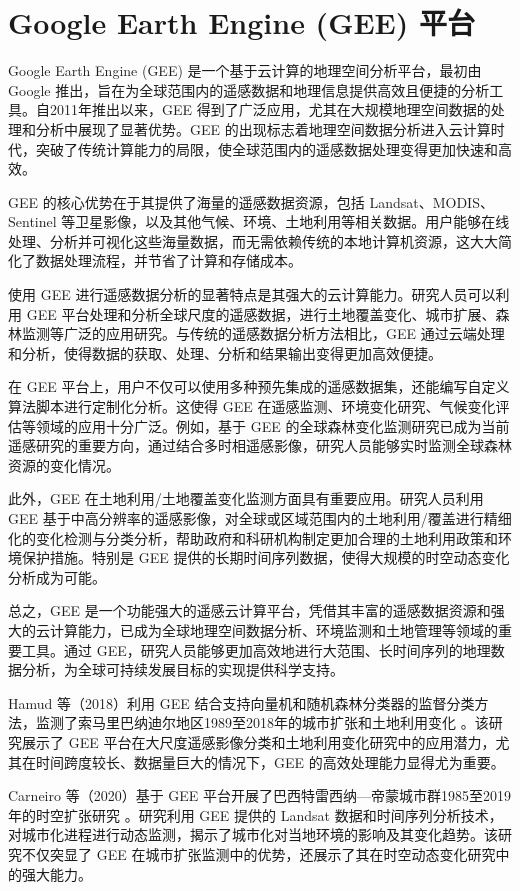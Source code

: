 \documentclass[AutoFakeBold]{LZUThesis-PgD&PhD}
\begin{document}
\section{Google Earth Engine (GEE) 平台}

Google Earth Engine (GEE) 是一个基于云计算的地理空间分析平台，最初由 Google 推出，旨在为全球范围内的遥感数据和地理信息提供高效且便捷的分析工具。自2011年推出以来，GEE 得到了广泛应用，尤其在大规模地理空间数据的处理和分析中展现了显著优势。GEE 的出现标志着地理空间数据分析进入云计算时代，突破了传统计算能力的局限，使全球范围内的遥感数据处理变得更加快速和高效。

GEE 的核心优势在于其提供了海量的遥感数据资源，包括 Landsat、MODIS、Sentinel 等卫星影像，以及其他气候、环境、土地利用等相关数据。用户能够在线处理、分析并可视化这些海量数据，而无需依赖传统的本地计算机资源，这大大简化了数据处理流程，并节省了计算和存储成本。

使用 GEE 进行遥感数据分析的显著特点是其强大的云计算能力。研究人员可以利用 GEE 平台处理和分析全球尺度的遥感数据，进行土地覆盖变化、城市扩展、森林监测等广泛的应用研究。与传统的遥感数据分析方法相比，GEE 通过云端处理和分析，使得数据的获取、处理、分析和结果输出变得更加高效便捷。

在 GEE 平台上，用户不仅可以使用多种预先集成的遥感数据集，还能编写自定义算法脚本进行定制化分析。这使得 GEE 在遥感监测、环境变化研究、气候变化评估等领域的应用十分广泛。例如，基于 GEE 的全球森林变化监测研究已成为当前遥感研究的重要方向，通过结合多时相遥感影像，研究人员能够实时监测全球森林资源的变化情况。

此外，GEE 在土地利用/土地覆盖变化监测方面具有重要应用。研究人员利用 GEE 基于中高分辨率的遥感影像，对全球或区域范围内的土地利用/覆盖进行精细化的变化检测与分类分析，帮助政府和科研机构制定更加合理的土地利用政策和环境保护措施。特别是 GEE 提供的长期时间序列数据，使得大规模的时空动态变化分析成为可能。

总之，GEE 是一个功能强大的遥感云计算平台，凭借其丰富的遥感数据资源和强大的云计算能力，已成为全球地理空间数据分析、环境监测和土地管理等领域的重要工具。通过 GEE，研究人员能够更加高效地进行大范围、长时间序列的地理数据分析，为全球可持续发展目标的实现提供科学支持。

Hamud 等（2018）利用 GEE 结合支持向量机和随机森林分类器的监督分类方法，监测了索马里巴纳迪尔地区1989至2018年的城市扩张和土地利用变化 \cite{Hamud2018}。该研究展示了 GEE 平台在大尺度遥感影像分类和土地利用变化研究中的应用潜力，尤其在时间跨度较长、数据量巨大的情况下，GEE 的高效处理能力显得尤为重要。

Carneiro 等（2020）基于 GEE 平台开展了巴西特雷西纳—帝蒙城市群1985至2019年的时空扩张研究 \cite{Carneiro2020}。研究利用 GEE 提供的 Landsat 数据和时间序列分析技术，对城市化进程进行动态监测，揭示了城市化对当地环境的影响及其变化趋势。该研究不仅突显了 GEE 在城市扩张监测中的优势，还展示了其在时空动态变化研究中的强大能力。
\end{document}
